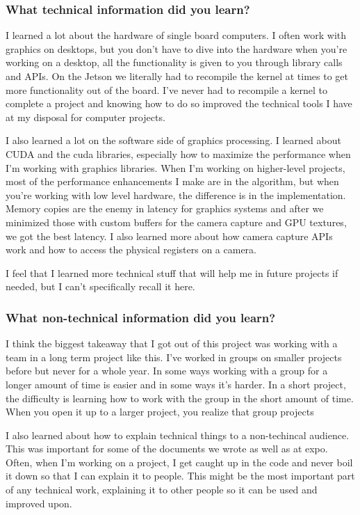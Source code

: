 \subsubsection{What technical information did you learn?}
I learned a lot about the hardware of single board computers. I often work with graphics on desktops, but you don't have to dive into the hardware when you're working on a desktop, all the functionality is given to you through library calls and APIs. On the Jetson we literally had to recompile the kernel at times to get more functionality out of the board. I've never had to recompile a kernel to complete a project and knowing how to do so improved the technical tools I have at my disposal for computer projects.
\par
I also learned a lot on the software side of graphics processing. I learned about CUDA and the cuda libraries, especially how to maximize the performance when I'm working with graphics libraries. When I'm working on higher-level projects, most of the performance enhancements I make are in the algorithm, but when you're working with low level hardware, the difference is in the implementation. Memory copies are the enemy in latency for graphics systems and after we minimized those with custom buffers for the camera capture and GPU textures, we got the best latency. I also learned more about how camera capture APIs work and how to access the physical registers on a camera.
\par
I feel that I learned more technical stuff that will help me in future projects if needed, but I can't specifically recall it here.
\subsubsection{What non-technical information did you learn?}
\par
I think the biggest takeaway that I got out of this project was working with a team in a long term project like this. I've worked in groups on smaller projects before but never for a whole year. In some ways working with a group for a longer amount of time is easier and in some ways it's harder. In a short project, the difficulty is learning how to work with the group in the short amount of time. When you open it up to a larger project, you realize that group projects 
\par
I also learned about how to explain technical things to a non-techincal audience. This was important for some of the documents we wrote as well as at expo. Often, when I'm working on a project, I get caught up in the code and never boil it down so that I can explain it to people. This might be the most important part of any technical work, explaining it to other people so it can be used and improved upon.
